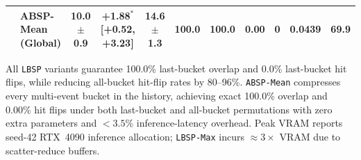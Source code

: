 \begin{table}[!htbp]
\begin{tabular*}{\textwidth}{@{\extracolsep{\fill}}llccccccccc@{}}
 & ABSP-Mean (Global) & \textbf{10.0 $\pm$ 0.9} & \textbf{+1.88$^{*}$} \scriptsize{[+0.52, +3.23]} & 14.6 $\pm$ 1.3 & \textbf{100.0} & \textbf{100.0} & \textbf{0.00} & 0 & 0.0439 & 69.9 \\
\bottomrule
\end{tabular*}
\par\smallskip\noindent\begin{minipage}{\textwidth}\fontsize{8}{10}\selectfont All \texttt{LBSP} variants guarantee 100.0\% last-bucket overlap and 0.0\% last-bucket hit flips, while reducing all-bucket hit-flip rates by 80--96\%. \texttt{ABSP-Mean} compresses every multi-event bucket in the history, achieving exact 100.0\% overlap and 0.00\% hit flips under both last-bucket and all-bucket permutations with zero extra parameters and $<3.5\%$ inference-latency overhead. Peak VRAM reports seed-42 RTX~4090 inference allocation; \texttt{LBSP-Max} incurs ${\approx}3\times$ VRAM due to scatter-reduce buffers.
\end{minipage}
\end{table}
